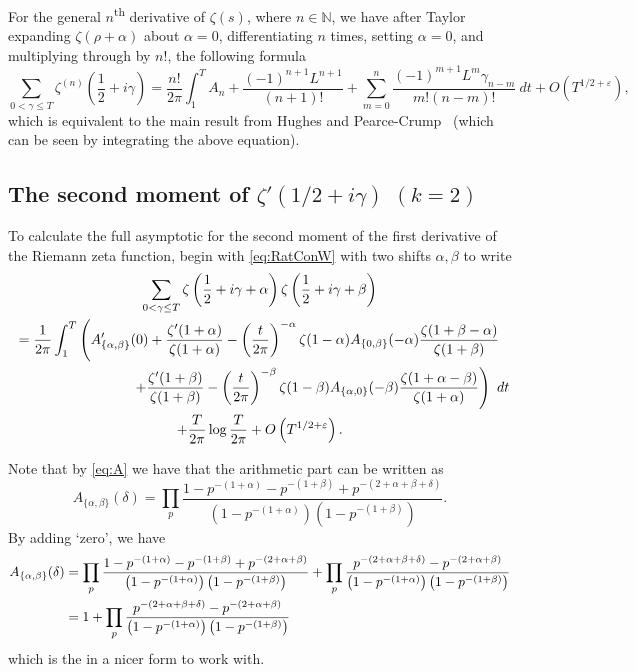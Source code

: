 \documentclass[12pt,a4paper,reqno]{amsart}
\theoremstyle{remark}
\numberwithin{equation}{section}
\begin{document}
For the general $n$\textsuperscript{th} derivative of $\zeta (s)$, where $n \in \mathbb{N}$, we have after Taylor expanding $\zeta (\rho + \alpha)$ about $\alpha =0$, differentiating $n$ times, setting $\alpha=0$, and multiplying through by $n!$, the following formula
\[
\sum_{0 < \gamma \leq T} \zeta ^{(n)} \left(\frac{1}{2} + i \gamma \right) = \frac{n!}{2 \pi} \int_{1}^{T} A_n + \frac{(-1)^{n+1} L^{n+1}}{(n+1)!} + \sum_{m=0}^{n} \frac{(-1)^{m+1} L^m \gamma_{n-m}}{m! (n-m)!} \ dt + O\left(T^{1/2 +\varepsilon}\right),
\]
which is equivalent to the main result from Hughes and Pearce-Crump~\cite{HugPC22} (which can be seen by integrating the above equation).

\subsection{The second moment of $\zeta ' (1/2 + i\gamma)$ $(k=2)$} \label{2ndMom} \hfill

To calculate the full asymptotic for the second moment of the first derivative of the Riemann zeta function, begin with \eqref{eq:RatConW} with two shifts $\alpha,\beta$ to write
\begin{multline*}
\sum_{0 < \gamma \leq T}  \zeta \left(\frac{1}{2} + i \gamma + \alpha \right) \zeta \left( \frac{1}{2} + i \gamma + \beta \right) \\
= \frac{1}{2 \pi} \int_{1}^{T} \left( A'_{\{\alpha,\beta\}}(0) +  \frac{\zeta'(1+\alpha)}{\zeta(1+\alpha)} - \left(\frac{t}{2 \pi} \right)^{-\alpha} \zeta(1-\alpha) A_{\{0,\beta\}}(-\alpha) \frac{\zeta(1+\beta - \alpha)}{\zeta(1+\beta)} \right. \\
\hphantom{spacespacespacespa} \left. + \frac{\zeta'(1+\beta)}{\zeta(1+\beta)} - \left(\frac{t}{2 \pi} \right)^{-\beta}\zeta(1-\beta) A_{\{\alpha,0\}}(-\beta) \frac{\zeta(1+\alpha - \beta)}{\zeta(1+\alpha)}  \right) \ dt \\
+ \frac{T}{2\pi} \log\frac{T}{2\pi} + O\left(T^{1/2 +\varepsilon}\right).
\end{multline*}

Note that by \eqref{eq:A} we have that the arithmetic part can be written as
\[
A_{\{\alpha, \beta\}}(\delta) = \prod_p \frac{1-p^{-(1+\alpha)}-p^{-(1+\beta)}+p^{-(2+\alpha+\beta+\delta)}}{\left(1-p^{-(1+\alpha)} \right) \left(1-p^{-(1+\beta)} \right)}.
\]
By adding `zero', we have
\begin{align}
    A_{\{\alpha, \beta\}}(\delta) &= \prod_p \frac{1-p^{-(1+\alpha)}-p^{-(1+\beta)}+p^{-(2+\alpha+\beta)}}{\left(1-p^{-(1+\alpha)} \right) \left(1-p^{-(1+\beta)} \right)} + \prod_p \frac{p^{-(2+\alpha+\beta+\delta)}-p^{-(2+\alpha+\beta)}}{\left(1-p^{-(1+\alpha)} \right) \left(1-p^{-(1+\beta)} \right)} \notag \\
    &= 1 + \prod_p \frac{p^{-(2+\alpha+\beta+\delta)}-p^{-(2+\alpha+\beta)}}{\left(1-p^{-(1+\alpha)} \right) \left(1-p^{-(1+\beta)} \right)} \label{eq:Arith2ndMom}
\end{align}
which is the in a nicer form to work with.
\end{document}
